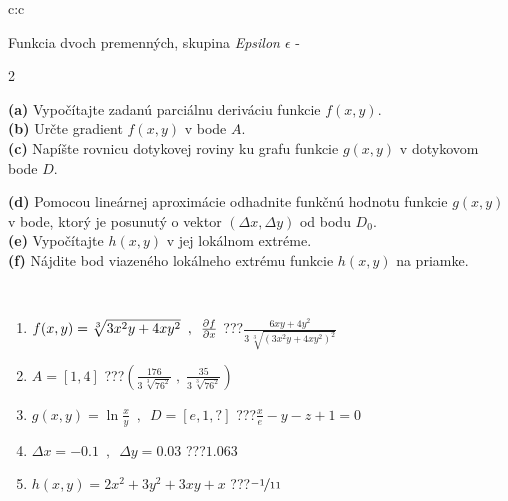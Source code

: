 \documentclass[10pt]{report}
\begin{document}
\begin{tabular}{c:c}
\begin{minipage}[c][104.5mm][t]{0.5\linewidth}
\begin{center}
\vspace{7mm}
{\huge \LARGE Funkcia dvoch premenných, skupina \textit{Epsilon $\epsilon$} -}\\[5mm]
\begin{minipage}{0.95\linewidth}
\begin{center}
{\small \begin{multicols}{2} \raggedright
\textbf{(a)} Vypočítajte zadanú parciálnu deriváciu funkcie \(f(x,y)\). \\[1mm]
\textbf{(b)} Určte gradient \(f(x,y)\) v bode \(A\). \\[1mm]
\textbf{(c)} Napíšte rovnicu dotykovej roviny ku grafu funkcie \(g(x,y)\) v dotykovom bode \(D\). \par \columnbreak
\textbf{(d)} Pomocou lineárnej aproximácie odhadnite funkčnú hodnotu funkcie \(g(x,y)\) v bode, ktorý je posunutý o vektor \((\Delta x, \Delta y)\) od bodu \(D_0\). \\[1mm]
\textbf{(e)} Vypočítajte \(h(x,y)\) v jej lokálnom extréme. \\[1mm]
\textbf{(f)} Nájdite bod viazeného lokálneho extrému funkcie \(h(x,y)\) na priamke. \\[1mm]
\end{multicols}
}
\end{center}
\end{minipage}
\\[4mm]
\begin{minipage}{0.79\linewidth}
\begin{center}
\begin{varwidth}{\linewidth}
\begin{enumerate}
\normalsizerr
\item $f(x,y) = \sqrt[3]{3x^2y + 4xy^2}\enspace , \enspace \pdv{f}{x}$\quad \dotfill\; ???\;\dotfill \quad $\frac{6xy+4y^2}{3\,\sqrt[3]{(3x^2y+4xy^2)^{2}}}$
\item $A = [1, 4]$\quad \dotfill\; ???\;\dotfill \quad $\left( \frac{176}{3\,\sqrt[3]{76^2}} \;,\; \frac{35}{3\,\sqrt[3]{76^2}} \right)$
\item $g(x,y) = \ln\frac{x}{y} \enspace , \enspace D=[e,1,?]$\quad \dotfill\; ???\;\dotfill \quad $\frac{x}{e} - y - z + 1 = 0$
\item $\Delta x = {-0.1} \enspace,\enspace \Delta y = {0.03}$\quad \dotfill\; ???\;\dotfill \quad $1.063$
\item $h(x,y) = 2x^2+3y^2+3xy+x$\quad \dotfill\; ???\;\dotfill \quad $\nicefrac{-1}{11}$

\end{enumerate}
\end{varwidth}
\end{center}
\end{minipage}
\end{center}
\end{minipage}
\end{tabular}
\end{document}
